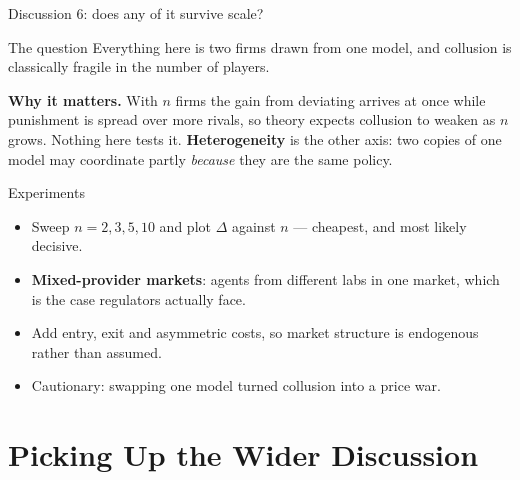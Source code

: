 \documentclass[aspectratio=169,9pt]{beamer}
\newcommand{\orange}[1]{\textcolor{AmazonOrange}{\textbf{#1}}}
\newcommand{\blue}[1]{\textcolor{densityblue}{\textbf{#1}}}
\newcommand{\muted}[1]{\textcolor{EPICMuted}{#1}}
\begin{document}
\begin{frame}{Discussion 6: does any of it survive scale?}
\begin{block}{The question}
Everything here is two firms drawn from one model, and collusion is classically fragile in the number of
players.
\end{block}
\pause
\vspace{0.1cm}
\textbf{Why it matters.} With $n$ firms the gain from deviating arrives at once while punishment is spread over
more rivals, so theory expects collusion to weaken as $n$ grows. Nothing here tests it. \orange{Heterogeneity}
is the other axis: two copies of one model may coordinate partly \textit{because} they are the same policy.
\pause
\vspace{0.1cm}
\begin{block}{Experiments}
\begin{itemize}
    \item Sweep $n = 2, 3, 5, 10$ and plot $\Delta$ against $n$ --- cheapest, and most likely decisive.
    \item \blue{Mixed-provider markets}: agents from different labs in one market, which is the case regulators
    actually face.
    \item Add entry, exit and asymmetric costs, so market structure is endogenous rather than assumed.
    \item \muted{Cautionary: swapping one model turned collusion into a price war.}
\end{itemize}
\end{block}
\end{frame}

\section{Picking Up the Wider Discussion}
\end{document}
